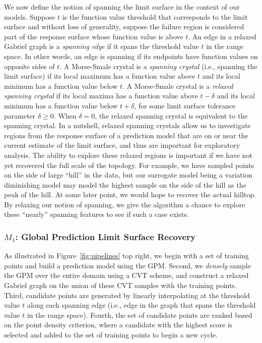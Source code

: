 We now define the notion of spanning the limit surface in the context of our models.
%
Suppose $t$ is the function value threshold that corresponds to the limit surface and without loss of generality, suppose the failure region is considered part of the response surface whose function value is above $t$.
%
An edge in a relaxed Gabriel graph is a \emph{spanning edge} if it spans the threshold value $t$ in the range space.
%
In other words, an edge is spanning if its endpoints have function values on opposite sides of $t$.
%
A Morse-Smale crystal is a \emph{spanning crystal} (i.e., spanning the limit surface) if its local maximum has a function value above $t$ and its local minimum has a function value below $t$.
%
A Morse-Smale crystal is a \emph{relaxed spanning crystal} if its local maxima has a function value above $t-\delta$ and its local minimum has a function value below $t+\delta$, for some limit surface tolerance parameter $\delta \geq 0$.
%
When $\delta = 0$, the relaxed spanning crystal is equivalent to the spanning crystal.
%
In a nutshell, relaxed spanning crystals allow us to investigate regions from the response surface of a prediction model that are on or near the current estimate of the limit surface, and thus are important for exploratory analysis.
%
The ability to explore these relaxed regions is important if we have not yet recovered the full scale of the topology.
%
For example, we have sampled points on the side of large ``hill'' in the data, but our surrogate model being a variation diminishing model may model the highest sample on the side of the hill as the peak of the hill.
%
At some later point, we would hope to recover the actual hilltop.
%
By relaxing our notion of spanning, we give the algorithm a chance to explore these ``nearly'' spanning features to see if such a case exists.
%

\subsubsection{$M_1$: Global Prediction Limit Surface Recovery}
As illustrated in Figure~\ref{fig:pipelines} top right, we begin with a set of training points and build a prediction model using the GPM.
%
Second, we \emph{densely} sample the GPM over the entire domain using a CVT scheme, and construct a relaxed Gabriel graph on the union of these CVT samples with the training points.
%
Third, candidate points are generated by linearly interpolating at the threshold value $t$ along each spanning edge (i.e., edge in the graph that spans the threshold value $t$ in the range space).
%
Fourth, the set of candidate points are ranked based on the point density criterion, where a candidate with the highest score is selected and added to the set of training points to begin a new cycle.


